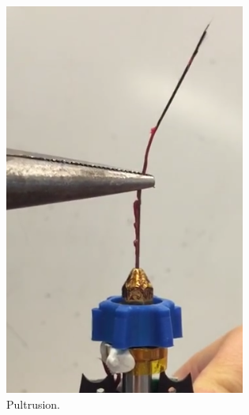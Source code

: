 \begin{figure}[t]
        \centering
        \begin{subfigure}[b]{0.4\linewidth}
                \includegraphics[width=\linewidth]{./figures/pultrusion-vid}
                \caption{Pultrusion.}
                \label{fig:pultrusion-vid}
        \end{subfigure}
        \begin{subfigure}[b]{0.4\linewidth}

\end{subfigure}
\end{figure}
